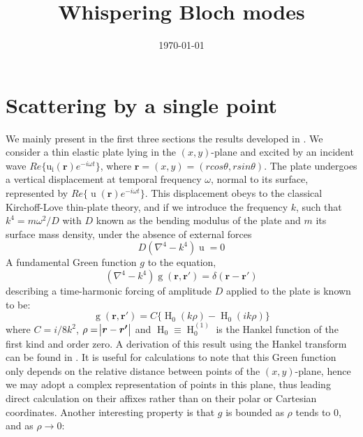\documentclass[11pt]{report}
\title{Whispering Bloch modes}
\date{\today}
\numberwithin{equation}{section}
\begin{document}
\maketitle

\tableofcontents


\chapter{Scattering by a single point}

We mainly present in the first three sections the results developed in \cite{evans2007penetration}. We consider a thin elastic plate lying in the $(x,y)$-plane and excited by an incident wave $Re\{\operatorname{u_i}(\bm{r})e^{-i \omega t}\}$, where $\bm{r} = (x,y) = (r cos \theta, r sin \theta)$. The plate undergoes a vertical displacement at temporal frequency $\omega$, normal to its surface, represented by $Re\{\operatorname{u}(\bm{r})e^{-i \omega t}\}$. This displacement obeys to the classical Kirchoff-Love thin-plate theory, and if we introduce the frequency $k$, such that $k^4=m\omega^2/D$ with $D$ known as the bending modulus of the plate and $m$ its surface mass density, under the absence of external forces
%
\begin{equation}
   D(\nabla^4-k^4)\operatorname{u}=0
\end{equation}
%
A fundamental Green function $g$ to the equation,
%
\begin{equation}
    (\nabla^4-k^4)\operatorname{g}(\bm{r},\bm{r'})=\delta(\bm{r}-\bm{r'})
\end{equation}
%
describing a time-harmonic forcing of amplitude $D$ applied to the plate is known to be:
%
\begin{equation}
    \operatorname{g}(\bm{r},\bm{r'}) = C\{\operatorname{H}_0(k\rho)-\operatorname{H}_0(ik\rho)\}    
\end{equation}
%
where $C=i/8k^2$, $\rho=\abs{\bm{r}-\bm{r'}}$ and $\operatorname{H}_0 \equiv \operatorname{H}_0^{(1)}$ is the Hankel function of the first kind and order zero. A derivation of this result using the Hankel transform can be found in \cite{hayek2010}. It is useful for calculations to note that this Green function only depends on the relative distance between points of the $(x,y)$-plane, hence we may adopt a complex representation of points in this plane, thus leading direct calculation on their affixes rather than on their polar or Cartesian coordinates. Another interesting property is that $g$ is bounded as $\rho$ tends to $0$, and as $\rho \rightarrow 0$: 
\end{document}
